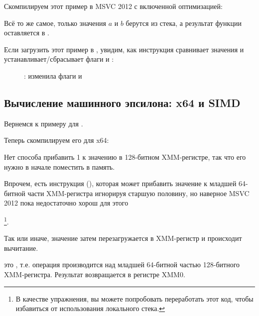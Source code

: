 Скомпилируем этот пример в MSVC 2012 с включенной оптимизацией:



Всё то же самое, только значения $a$ и $b$ 
берутся из стека, а результат функции оставляется в .

Если загрузить этот пример в \olly, 
увидим, как инструкция  сравнивает значения и устанавливает/сбрасывает
флаги \CF и \PF:

\begin{figure}[H]
\centering
{}
\caption{\olly:  изменила флаги \CF и \PF}
\label{fig:FPU_SIMD_d_max_olly}
\end{figure}

\subsection{Вычисление машинного эпсилона: x64 и SIMD}
\label{machine_epsilon_x64_and_SIMD}

Вернемся к примеру  для \Tdouble {}.

Теперь скомпилируем его для x64:



Нет способа прибавить 1 к значению в 128-битном XMM-регистре, так что его нужно в начале поместить в память.

Впрочем, есть инструкция  (),
которая может прибавить значение к младшей 64-битной части XMM-регистра игнорируя старшую половину,
но наверное MSVC 2012 пока недостаточно хорош для этого

\footnote{В качестве упражнения, вы можете попробовать переработать этот код, чтобы избавиться 
от использования локального стека.}.

Так или иначе, значение затем перезагружается в XMM-регистр и происходит вычитание.

 это , 
т.е. операция производится над младшей 64-битной частью 128-битного XMM-регистра.
Результат возвращается в регистре XMM0.



